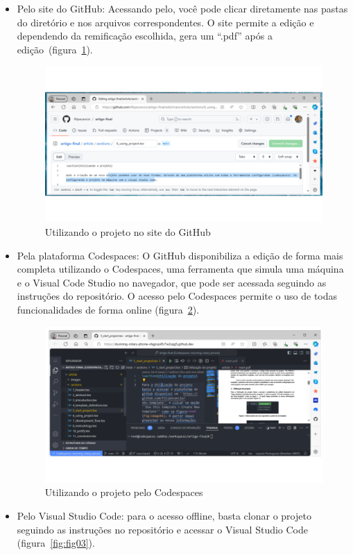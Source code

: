 \begin{itemize}
	\item Pelo  site do GitHub: Acessando pelo, você pode clicar diretamente nas pastas do diretório e nos arquivos correspondentes. O site permite a edição e dependendo da remificação escolhida, gera um ``.pdf'' após a edição~(figura~\ref{fig:fig01}).
	
	\begin{figure}[H]
		\centering
		\includegraphics[width=.6\textwidth]{./images/fig03.png}
		\caption{Utilizando o projeto no site do GitHub}
		\label{fig:fig01}
	\end{figure}

	\item Pela plataforma Codespaces: O GitHub disponibiliza a edição  de forma mais completa utilizando o Codespaces, uma ferramenta que simula uma máquina e o Visual Code Studio no navegador, que pode ser acessada seguindo as instruções do repositório. O acesso pelo Codespaces permite o uso de todas funcionalidades de forma online (figura~\ref{fig:fig02}).
	
	\begin{figure}[H]
		\centering
		\includegraphics[width=.6\textwidth]{./images/fig02.png}
		\caption{Utilizando o projeto pelo Codespaces}
		\label{fig:fig02}
	\end{figure}

	\item Pelo Visual Studio Code: para o acesso offline, basta clonar o projeto seguindo as instruções no repositório e acessar o Visual Studio Code (figura~\ref{fig:fig03}).
	

\end{itemize}

